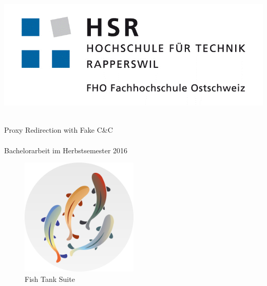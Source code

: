 
\author{
	\sadf \\
	\and
	\fbif \\
}
\clearpage
\begin{titlepage}
	\begin{minipage}{0.4\textwidth}
		\includegraphics[width=\textwidth]{img/hsr}
	\end{minipage}
	\hfill
	\begin{minipage}[b]{0.4\textwidth}
	\end{minipage}

	\begin{center}
		\hr{1pt} \\[0.2cm]
		\huge Proxy Redirection with Fake C\&C \\
		\hr{1pt} \\[0.2cm]
		\Large{Bachelorarbeit im Herbstsemester 2016} \\ [25pt]
		\begin{figure}[h]
			\centering
			\includegraphics[width=0.5\textwidth]{img/Fish_all.png} \\
			\Large{Fish Tank Suite} \\ [40pt]
		\end{figure}
		\vfill
	\end{center}


\end{titlepage}
